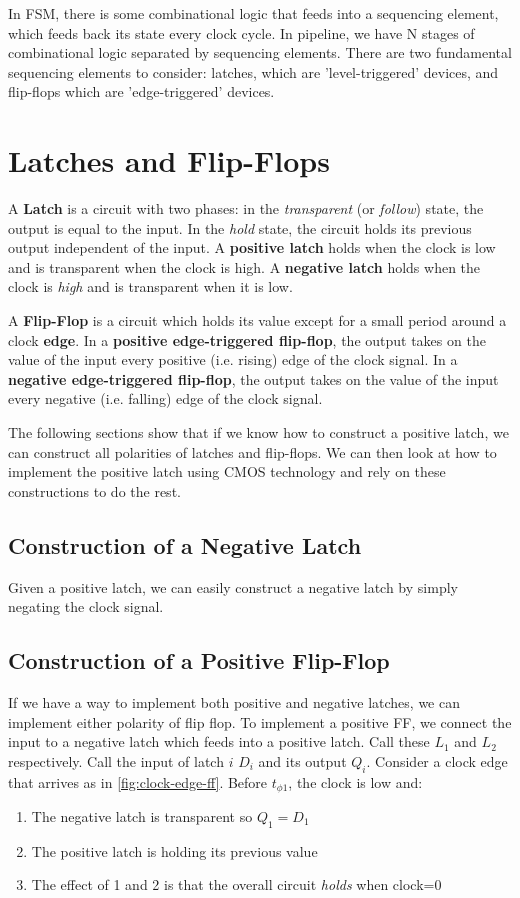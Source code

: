 \documentclass[11pt]{report}
\begin{document}
In FSM, there is some combinational logic that feeds into a sequencing element, which feeds back its state every clock cycle. In pipeline, we have N stages of combinational logic separated by sequencing elements. There are two fundamental sequencing elements to consider: latches, which are 'level-triggered' devices, and flip-flops which are 'edge-triggered' devices.


\section{Latches and Flip-Flops}\label{sec:latches-ffs}

A \textbf{Latch} is a circuit with two phases: in the \textit{transparent} (or \textit{follow}) state, the output is equal to the input. In the \textit{hold} state, the circuit holds its previous output independent of the input. A \textbf{positive latch} holds when the clock is low and is transparent when the clock is high. A \textbf{negative latch} holds when the clock is \textit{high} and is transparent when it is low.


A \textbf{Flip-Flop} is a circuit which holds its value except for a small period around a clock \textbf{edge}. In a \textbf{positive edge-triggered flip-flop}, the output takes on the value of the input every positive (i.e. rising) edge of the clock signal. In a \textbf{negative edge-triggered flip-flop}, the output takes on the value of the input every negative (i.e. falling) edge of the clock signal.

The following sections show that if we know how to construct a positive latch, we can construct all polarities of latches and flip-flops. We can then look at how to implement the positive latch using CMOS technology and rely on these constructions to do the rest.

\subsection{Construction of a Negative Latch}
Given a positive latch, we can easily construct a negative latch by simply negating the clock signal.

\subsection{Construction of a Positive Flip-Flop}\label{sec:positive-flip-flop}
If we have a way to implement both positive and negative latches, we can implement either polarity of flip flop. To implement a positive FF, we connect the input to a negative latch which feeds into a positive latch. Call these $L_1$ and $L_2$ respectively. Call the input of latch $i$ $D_i$ and its output $Q_i$. Consider a clock edge that arrives as in \autoref{fig:clock-edge-ff}. Before $t_{\phi1}$, the clock is low and:
\begin{enumerate}
	\item The negative latch is transparent so $Q_1 = D_1$
	\item The positive latch is holding its previous value
	\item The effect of 1 and 2 is that the overall circuit \textit{holds} when clock=0
\end{enumerate}
\end{document}

